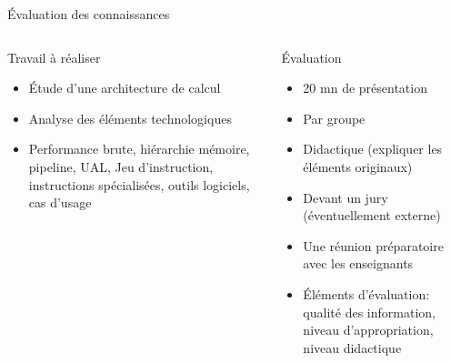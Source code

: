 %
\begin{Frame}{Évaluation des connaissances}
  \begin{columns}[t]
    \begin{column}{5cm} %
      \begin{block}{Travail à réaliser}
        \begin{itemize}
        \item Étude d'une architecture de calcul
        \item Analyse des éléments technologiques
        \item Performance brute, hiérarchie mémoire, pipeline, UAL,
          Jeu d'instruction, instructions spécialisées, outils
          logiciels, cas d'usage
        \end{itemize}
      \end{block} 
    \end{column}
    
    \begin{column}{5cm} %
      \begin{block}{Évaluation}
        \begin{itemize}
        \item 20 mn de présentation
        \item Par groupe
        \item Didactique (expliquer les éléments originaux)
        \item Devant un jury (éventuellement externe)
        \item Une réunion préparatoire avec les enseignants
        \item Éléments d'évaluation: qualité des information, niveau
          d'appropriation, niveau didactique
        \end{itemize}
      \end{block}   
    \end{column}
  \end{columns}  
\end{Frame}


